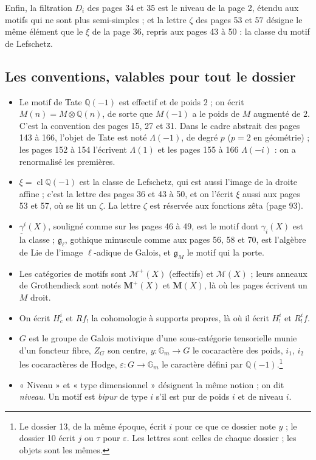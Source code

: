 \documentclass[11pt,a4paper]{article}
\begin{document}
Enfin, la filtration $D_{i}$ des pages 34 et 35 est le niveau de la page 2,
étendu aux motifs qui ne sont plus semi-simples ; et la lettre $\zeta$ des pages
53 et 57 désigne le même élément que le $\xi$ de la page 36, repris aux pages 43
à 50 : la classe du motif de Lefschetz.

\subsection*{Les conventions, valables pour tout le dossier}

\begin{itemize}
  \item Le motif de Tate $\mathbb{Q}(-1)$ est effectif et de poids $2$ ; on
  écrit $M(n) = M \otimes \mathbb{Q}(n)$, de sorte que $M(-1)$ a le poids de
  $M$ augmenté de $2$. C'est la convention des pages 15, 27 et 31. Dans le cadre
  abstrait des pages 143 à 166, l'objet de Tate est noté $\Lambda(-1)$, de degré
  $p$ ($p = 2$ en géométrie) ; les pages 152 à 154 l'écrivent $\Lambda(1)$ et les
  pages 155 à 166 $\Lambda(-i)$ : on a renormalisé les premières.
  \item $\xi = \operatorname{cl}\mathbb{Q}(-1)$ est la classe de Lefschetz, qui
  est aussi l'image de la droite affine ; c'est la lettre des pages 36 et 43 à
  50, et on l'écrit $\xi$ aussi aux pages 53 et 57, où se lit un $\zeta$. La
  lettre $\zeta$ est réservée aux fonctions zêta (page 93).
  \item $\underline{\gamma}^{i}(X)$, souligné comme sur les pages 46 à 49, est le
  motif dont $\gamma_{i}(X)$ est la classe ; $\mathfrak{g}_{\ell}$, gothique
  minuscule comme aux pages 56, 58 et 70, est l'algèbre de Lie de l'image
  $\ell$-adique de Galois, et $\mathfrak{g}_{M}$ le motif qui la porte.
  \item Les catégories de motifs sont $\mathcal{M}^{+}(X)$ (effectifs) et
  $\mathcal{M}(X)$ ; leurs anneaux de Grothendieck sont notés
  $\mathbf{M}^{+}(X)$ et $\mathbf{M}(X)$, là où les pages écrivent un $M$ droit.
  \item On écrit $H^{i}_{c}$ et $Rf_{!}$ la cohomologie à supports propres, là
  où il écrit $H^{i}_{!}$ et $R^{i}_{!}f$.
  \item $G$ est le groupe de Galois motivique d'une sous-catégorie tensorielle
  munie d'un foncteur fibre, $Z_{G}$ son centre, $y \colon \mathbb{G}_{m} \to G$
  le cocaractère des poids, $i_{1}$, $i_{2}$ les cocaractères de Hodge,
  $\varepsilon \colon G \to \mathbb{G}_{m}$ le caractère défini par
  $\mathbb{Q}(-1)$.\footnote{Le dossier 13, de la même époque, écrit $i$ pour ce
  que ce dossier note $y$ ; le dossier 10 écrit $j$ ou $\tau$ pour
  $\varepsilon$. Les lettres sont celles de chaque dossier ; les objets sont les
  mêmes.}
  \item « Niveau » et « type dimensionnel » désignent la même notion ; on dit
  \emph{niveau}. Un motif est \emph{bipur} de type $i$ s'il est pur de poids $i$
  et de niveau $i$.
\end{itemize}
\end{document}
